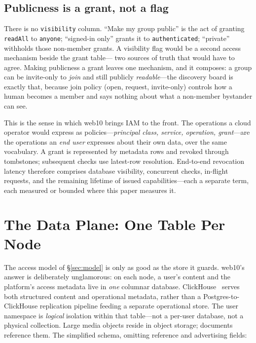 \documentclass[sigconf, nonacm]{acmart}
\begin{document}
\subsection{Publicness is a grant, not a flag}

There is no \texttt{visibility} column. ``Make my group public'' is the act
of granting \texttt{readAll} to \texttt{anyone}; ``signed-in only'' grants it
to \texttt{authenticated}; ``private'' withholds those non-member grants. A
visibility flag would be a second access mechanism beside the grant table---
two sources of truth that would have to agree. Making publicness a grant
leaves one mechanism, and it composes: a group can be invite-only to \emph{join}
and still publicly \emph{readable}---the discovery board is exactly that,
because join policy (open, request, invite-only) controls how a human
becomes a member and says nothing about what a non-member bystander can see.

This is the sense in which web10 brings IAM to the front. The operations a
cloud operator would express as policies---\emph{principal class, service,
operation, grant}---are the operations an \emph{end user} expresses about
their own data, over the same vocabulary. A grant is represented by metadata
rows and revoked through tombstones; subsequent checks use latest-row
resolution. End-to-end revocation latency therefore comprises database
visibility, concurrent checks, in-flight requests, and the remaining
lifetime of issued capabilities---each a separate term, each measured or
bounded where this paper measures it.

\section{The Data Plane: One Table Per Node}
\label{sec:data}

The access model of \S\ref{sec:model} is only as good as the store it guards.
web10's answer is deliberately unglamorous: on each node, a user's content
and the platform's access metadata live in \emph{one} columnar database.
ClickHouse~\cite{clickhouse2024} serves both structured content and
operational metadata, rather than a Postgres-to-ClickHouse replication
pipeline feeding a separate operational store. The user namespace is
\emph{logical} isolation within that table---not a per-user database, not a
physical collection. Large media objects reside in object storage; documents
reference them. The simplified schema, omitting reference and advertising
fields:
\end{document}
